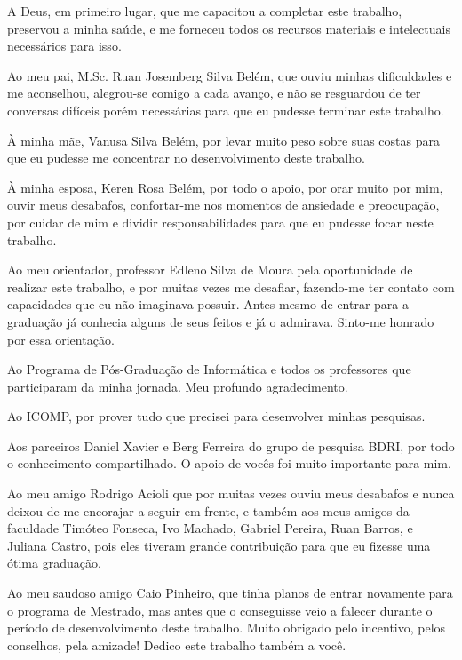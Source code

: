 \documentclass[
	12pt,				%
	openright,			%
	twoside,			%
	a4paper,			%
	english,			%
	spanish,			%
	brazil,				%
	]{abntex2}
\begin{document}
\begin{agradecimentos}

A Deus, em primeiro lugar, que me capacitou a completar este trabalho, preservou a minha saúde, e me forneceu todos os recursos materiais e intelectuais necessários para isso.

Ao meu pai, M.Sc. Ruan Josemberg Silva Belém, que ouviu minhas dificuldades e me aconselhou, alegrou-se comigo a cada avanço, e não se resguardou de ter conversas difíceis porém necessárias para que eu pudesse terminar este trabalho. 

À minha mãe, Vanusa Silva Belém, por levar muito peso sobre suas costas para que eu pudesse me concentrar no desenvolvimento deste trabalho.

À minha esposa, Keren Rosa Belém, por todo o apoio, por orar muito por mim, ouvir meus desabafos, confortar-me nos momentos de ansiedade e preocupação, por cuidar de mim e dividir responsabilidades para que eu pudesse focar neste trabalho. 

Ao meu orientador, professor Edleno Silva de Moura pela oportunidade de realizar este trabalho, e por muitas vezes me desafiar, fazendo-me ter contato com capacidades que eu não imaginava possuir. Antes mesmo de entrar para a graduação já conhecia alguns de seus feitos e já o admirava. Sinto-me honrado por essa orientação.

Ao Programa de Pós-Graduação de Informática e todos os professores que participaram da minha jornada. Meu profundo agradecimento.

Ao ICOMP, por prover tudo que precisei para desenvolver minhas pesquisas.

Aos parceiros Daniel Xavier e Berg Ferreira do grupo de pesquisa BDRI, por todo o conhecimento compartilhado. O apoio de vocês foi muito importante para mim.

Ao meu amigo Rodrigo Acioli que por muitas vezes ouviu meus desabafos e nunca deixou de me encorajar a seguir em frente, e também aos meus amigos da faculdade Timóteo Fonseca, Ivo Machado, Gabriel Pereira, Ruan Barros, e Juliana Castro, pois eles tiveram grande contribuição para que eu fizesse uma ótima graduação.

Ao meu saudoso amigo Caio Pinheiro, que tinha planos de entrar novamente para o programa de Mestrado, mas antes que o conseguisse veio a falecer durante o período de desenvolvimento deste trabalho. Muito obrigado pelo incentivo, pelos conselhos, pela amizade! Dedico este trabalho também a você.

\end{agradecimentos}
\end{document}
